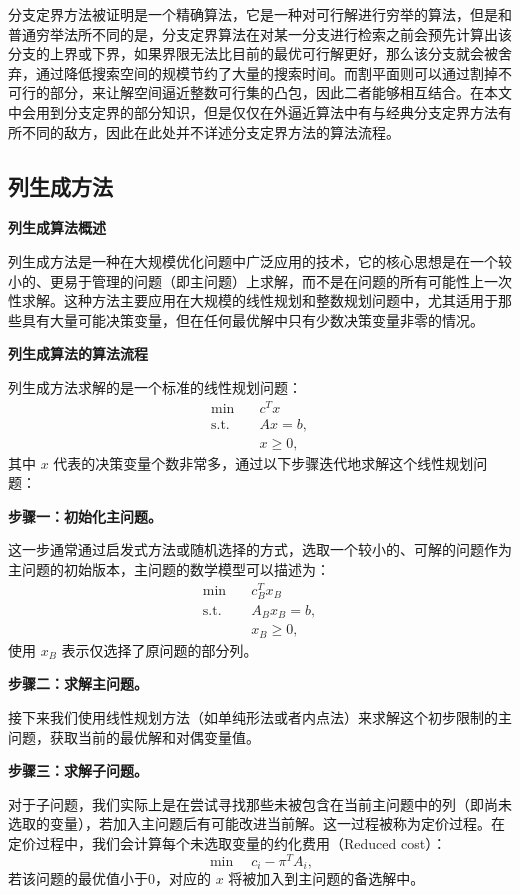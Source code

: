 分支定界方法被证明是一个精确算法，它是一种对可行解进行穷举的算法，但是和普通穷举法所不同的是，分支定界算法在对某一分支进行检索之前会预先计算出该分支的上界或下界，如果界限无法比目前的最优可行解更好，那么该分支就会被舍弃，通过降低搜索空间的规模节约了大量的搜索时间。而割平面则可以通过割掉不可行的部分，来让解空间逼近整数可行集的凸包，因此二者能够相互结合。在本文中会用到分支定界的部分知识，但是仅仅在外逼近算法中有与经典分支定界方法有所不同的敌方，因此在此处并不详述分支定界方法的算法流程。



\subsection{列生成方法}
\textbf{列生成算法概述}

列生成方法是一种在大规模优化问题中广泛应用的技术，它的核心思想是在一个较小的、更易于管理的问题（即主问题）上求解，而不是在问题的所有可能性上一次性求解。这种方法主要应用在大规模的线性规划和整数规划问题中，尤其适用于那些具有大量可能决策变量，但在任何最优解中只有少数决策变量非零的情况。

\textbf{列生成算法的算法流程}

列生成方法求解的是一个标准的线性规划问题：
\begin{align*}
    \min \quad & c^T x \\
    \text{s.t.} \quad & Ax = b, \\
                       & x \geq 0,
\end{align*}
其中 $x$ 代表的决策变量个数非常多，通过以下步骤迭代地求解这个线性规划问题：

\textbf{步骤一：初始化主问题。}

这一步通常通过启发式方法或随机选择的方式，选取一个较小的、可解的问题作为主问题的初始版本，主问题的数学模型可以描述为：
\begin{align*}
    \min \quad & c_B^T x_B \\
    \text{s.t.} \quad & A_B x_B = b, \\
                       & x_B \geq 0,
\end{align*}
使用 $x_B$ 表示仅选择了原问题的部分列。

\textbf{步骤二：求解主问题。}

接下来我们使用线性规划方法（如单纯形法或者内点法）来求解这个初步限制的主问题，获取当前的最优解和对偶变量值。

\textbf{步骤三：求解子问题。}

对于子问题，我们实际上是在尝试寻找那些未被包含在当前主问题中的列（即尚未选取的变量），若加入主问题后有可能改进当前解。这一过程被称为定价过程。在定价过程中，我们会计算每个未选取变量的约化费用（Reduced cost）：
\begin{equation*}
    \min \quad c_i - \pi^T A_i,
\end{equation*}
若该问题的最优值小于0，对应的 $x$ 将被加入到主问题的备选解中。

